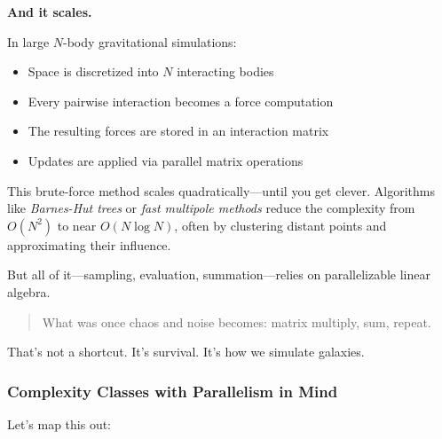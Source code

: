 \textbf{And it scales.}

In large \( N \)-body gravitational simulations:
\begin{itemize}
  \item Space is discretized into \( N \) interacting bodies
  \item Every pairwise interaction becomes a force computation
  \item The resulting forces are stored in an interaction matrix
  \item Updates are applied via parallel matrix operations
\end{itemize}

This brute-force method scales quadratically—until you get clever. Algorithms like \textit{Barnes-Hut trees} or \textit{fast multipole methods} reduce the complexity from \( O(N^2) \) to near \( O(N \log N) \), often by clustering distant points and approximating their influence.

But all of it—sampling, evaluation, summation—relies on parallelizable linear algebra.

\begin{quote}
What was once chaos and noise becomes: matrix multiply, sum, repeat.
\end{quote}

\noindent That’s not a shortcut. It’s survival. It’s how we simulate galaxies.





\subsubsection{Complexity Classes with Parallelism in Mind}

Let’s map this out:

\begin{center}
\end{center}

